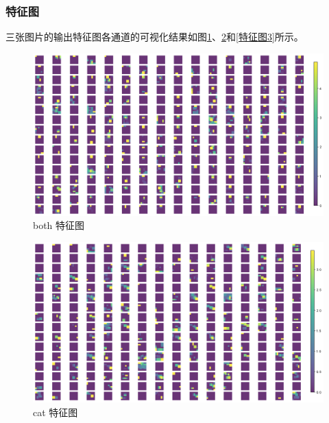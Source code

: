 \documentclass[supercite]{Experimental_Report}
\theoremstyle{definition}
\begin{document}
\subsubsection{特征图}
三张图片的输出特征图各通道的可视化结果如图\ref{特征图1}、\ref{特征图2}和\ref{特征图3}所示。
\begin{figure}[H]
	\begin{center}
		\includegraphics[scale=0.35]{../images/feature-map0.png}
		\caption{both 特征图}
		\label{特征图1}
	\end{center}
\end{figure}
\begin{figure}[H]
	\begin{center}
		\includegraphics[scale=0.35]{../images/feature-map1.png}
		\caption{cat 特征图}
		\label{特征图2}
	\end{center}
\end{figure}
\end{document}

